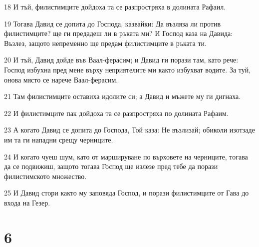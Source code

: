 \par 18 И тъй, филистимците дойдоха та се разпростряха в долината Рафаил.
\par 19 Тогава Давид се допита до Господа, казвайки: Да възляза ли против филистимците? ще ги предадеш ли в ръката ми? И Господ каза на Давида: Възлез, защото непременно ще предам филистимците в ръката ти.
\par 20 И тъй, Давид дойде във Ваал-ферасим; и Давид ги порази там, като рече: Господ избухна пред мене върху неприятелите ми както избухват водите. За туй, онова място се нарече Ваал-ферасим.
\par 21 Там филистимците оставиха идолите си; а Давид и мъжете му ги дигнаха.
\par 22 И филистимците пак дойдоха та се разпростряха по долината Рафаим.
\par 23 А когато Давид се допита до Господа, Той каза: Не възлизай; обиколи изотзаде им та ги нападни срещу черниците.
\par 24 И когато чуеш шум, като от маршируване по върховете на черниците, тогава да се подвижиш, защото тогава Господ ще излезе пред тебе да порази филистимското множество.
\par 25 И Давид стори както му заповяда Господ, и порази филистимците от Гава до входа на Гезер.

\chapter{6}

